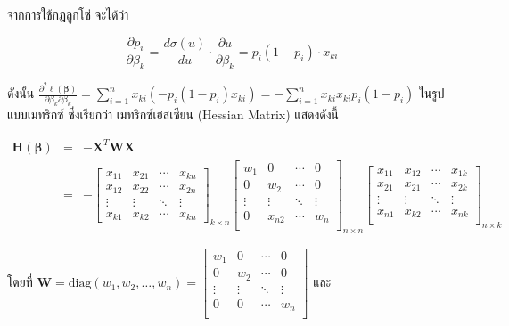 \noindent
จากการใช้กฎลูกโซ่  จะได้ว่า  

$$\frac{\partial p_i}{\partial \beta_k} = \frac{d\sigma(u)}{du} \cdot \frac{\partial u}{\partial \beta_k} = p_i(1-p_i) \cdot x_{ki}$$

\noindent
ดังนั้น $\frac{\partial^2 \ell(\boldsymbol{\beta})}{\partial \beta_k \partial \beta_k} = \sum_{i=1}^{n} x_{ki} \left(-p_i(1-p_i) x_{ki}\right) = -\sum_{i=1}^{n} x_{ki} x_{ki} p_i(1-p_i)$ ในรูปแบบเมทริกซ์ ซึ่งเรียกว่า เมทริกซ์เฮสเซียน (Hessian Matrix) แสดงดังนี้

\begin{eqnarray} \nonumber
	\mathbf{H}(\boldsymbol{\beta}) &=& -\mathbf{X}^{T} \mathbf{W} \mathbf{X} \\ \nonumber
	&=& - 	\begin{bmatrix}
		 x_{11} & x_{21} & \cdots & x_{kn} \\
		 x_{12} & x_{22} & \cdots & x_{2n} \\
		 \vdots & \vdots & \ddots & \vdots \\
		x_{k1} & x_{k2} & \cdots & x_{kn}
	\end{bmatrix}_{k \times n}
	\begin{bmatrix}
	w_{1}& 0& \cdots  & 0 \\
	0& w_{2}& \cdots & 0  \\
	\vdots & \vdots  & \ddots  & \vdots  \\
	0& x_{n2} & \cdots  & w_{n} \\
	\end{bmatrix}_{n \times n} 
	 \begin{bmatrix}
	x_{11}& x_{12}& \cdots  & x_{1k} \\
	x_{21}& x_{21}& \cdots & x_{2k}  \\
	\vdots & \vdots  & \ddots  & \vdots  \\
	x_{n1}& x_{k2} & \cdots  & x_{nk} \\
	\end{bmatrix}_{n \times k}
\end{eqnarray}
$$$$

\noindent
โดยที่ $\mathbf{W} = \text{diag}(w_1, w_2, \ldots, w_n)=\begin{bmatrix}
	w_{1}& 0& \cdots  & 0 \\
	0& w_{2}& \cdots & 0  \\
	\vdots & \vdots  & \ddots  & \vdots  \\
	
	0& 0 & \cdots  & w_{n} \\
\end{bmatrix} $ และ 

